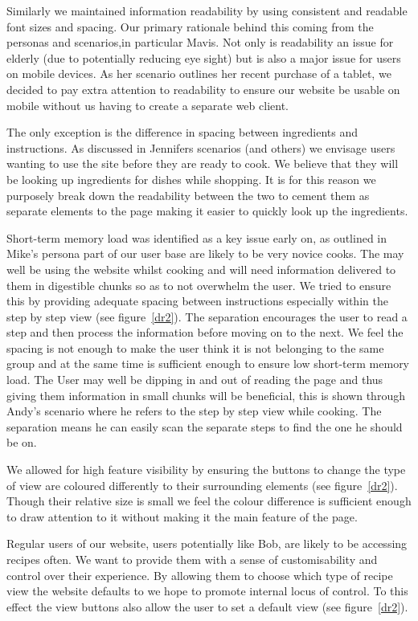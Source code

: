 Similarly we maintained information readability by using consistent and readable font sizes and spacing. Our primary rationale behind this coming from the personas and scenarios,in particular Mavis. Not only is readability an issue for elderly (due to potentially reducing eye sight) but is also a major issue for users on mobile devices. As her scenario outlines her recent purchase of a tablet, we decided to pay extra attention to readability to ensure our website be usable on mobile without us having to create a separate web client.

The only exception is the difference in spacing between ingredients and instructions. As discussed in Jennifers scenarios (and others) we envisage users wanting to use the site before they are ready to cook. We believe that they will be looking up ingredients for dishes while shopping. It is for this reason we purposely break down the readability between the two to cement them as separate elements to the page making it easier to quickly look up the ingredients.

Short-term memory load was identified as a key issue early on, as outlined in Mike's persona part of our user base are likely to be very novice cooks. The may well be using the website whilst cooking and will need information delivered to them in digestible chunks so as to not overwhelm the user. We tried to ensure this by providing adequate spacing between instructions especially within the step by step view (see figure~\ref{dr2}). The separation encourages the user to read a step and then process the information before moving on to the next. We feel the spacing is not enough to make the user think it is not belonging to the same group and at the same time is sufficient enough to ensure low short-term memory load. The User may well be dipping in and out of reading the page and thus giving them information in small chunks will be beneficial, this is shown through Andy's scenario where he refers to the step by step view while cooking. The separation means he can easily scan the separate steps to find the one he should be on.

We allowed for high feature visibility by ensuring the buttons to change the type of view are coloured differently to their surrounding elements (see figure~\ref{dr2}). Though their relative size is small we feel the colour difference is sufficient enough to draw attention to it without making it the main feature of the page.

Regular users of our website, users potentially like Bob, are likely to be accessing recipes often. We want to provide them with a sense of customisability and control over their experience. By allowing them to choose which type of recipe view the website defaults to we hope to promote internal locus of control. To this effect the view buttons also allow the user to set a default view (see figure~\ref{dr2}).

